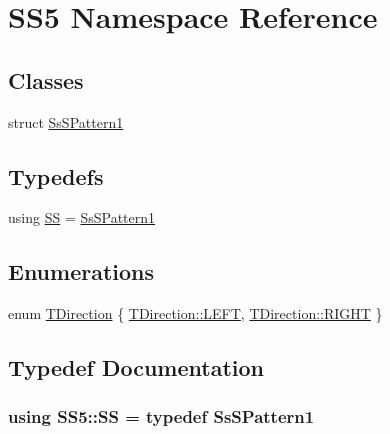 \hypertarget{namespaceSS5}{}\section{S\+S5 Namespace Reference}
\label{namespaceSS5}
\subsection*{Classes}
\begin{DoxyCompactItemize}
\item 
struct \hyperlink{structSS5_1_1SsSPattern1}{Ss\+S\+Pattern1}
\end{DoxyCompactItemize}
\subsection*{Typedefs}
\begin{DoxyCompactItemize}
\item 
using \hyperlink{namespaceSS5_ac4383647d40724fa239f95d23951d2b3}{SS} = \hyperlink{structSS5_1_1SsSPattern1}{Ss\+S\+Pattern1}
\end{DoxyCompactItemize}
\subsection*{Enumerations}
\begin{DoxyCompactItemize}
\item 
enum \hyperlink{namespaceSS5_a567f4bfbe784969d523c1fa15e2cf713}{T\+Direction} \{ \hyperlink{namespaceSS5_a567f4bfbe784969d523c1fa15e2cf713a684d325a7303f52e64011467ff5c5758}{T\+Direction\+::\+L\+E\+FT}, 
\hyperlink{namespaceSS5_a567f4bfbe784969d523c1fa15e2cf713a21507b40c80068eda19865706fdc2403}{T\+Direction\+::\+R\+I\+G\+HT}
 \}
\end{DoxyCompactItemize}


\subsection{Typedef Documentation}
\subsubsection[{\texorpdfstring{SS}{SS}}]{\setlength{\rightskip}{0pt plus 5cm}using {\bf S\+S5\+::\+SS} = typedef {\bf Ss\+S\+Pattern1}}\hypertarget{namespaceSS5_ac4383647d40724fa239f95d23951d2b3}{}\label{namespaceSS5_ac4383647d40724fa239f95d23951d2b3}


